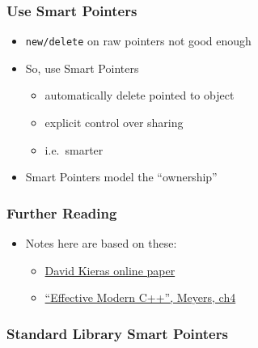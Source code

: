 \subsubsection{Use Smart Pointers}\label{use-smart-pointers}

\begin{itemize}
\itemsep1pt\parskip0pt
\item
  \texttt{new/delete} on raw pointers not good enough
\item
  So, use Smart Pointers

  \begin{itemize}
  \itemsep1pt\parskip0pt
  \item
    automatically delete pointed to object
  \item
    explicit control over sharing
  \item
    i.e.~smarter
  \end{itemize}
\item
  Smart Pointers model the ``ownership''
\end{itemize}

\subsubsection{Further Reading}\label{further-reading}

\begin{itemize}
\itemsep1pt\parskip0pt
\item
  Notes here are based on these:

  \begin{itemize}
  \itemsep1pt\parskip0pt
  \item
    \href{http://www.umich.edu/~eecs381/handouts/C++11_smart_ptrs.pdf}{David
    Kieras online paper}
  \item
    \href{https://www.amazon.co.uk/Effective-Modern-Specific-Ways-Improve/dp/1491903996/ref=sr_1_1?ie=UTF8\&qid=1484571499\&sr=8-1\&keywords=Effective+Modern+C\%2B\%2B}{``Effective
    Modern C++'', Meyers, ch4}
  \end{itemize}
\end{itemize}

\subsubsection{Standard Library Smart
Pointers}\label{standard-library-smart-pointers}

